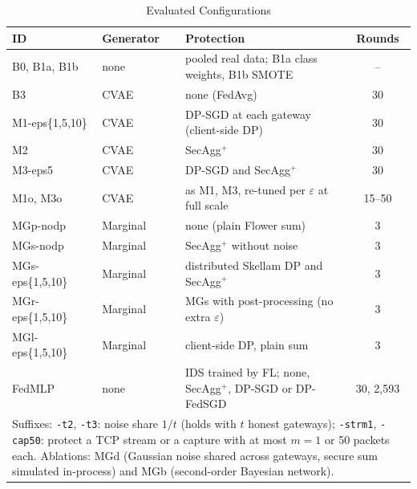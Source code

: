 \begin{table}[!t]
\centering
\caption{Evaluated Configurations}
\label{tab:configs}
\scriptsize
\setlength{\tabcolsep}{3pt}
\begin{tabularx}{\columnwidth}{l l >{\raggedright\arraybackslash}X c}
\toprule
\textbf{ID} & \textbf{Generator} & \textbf{Protection} & \textbf{Rounds} \\
\midrule
B0, B1a, B1b & none & pooled real data; B1a class weights, B1b SMOTE~\cite{chawla2002} & -- \\
B3           & CVAE & none (FedAvg) & 30 \\
M1-eps\{1,5,10\} & CVAE & DP-SGD at each gateway (client-side DP) & 30 \\
M2           & CVAE & SecAgg$^+$ & 30 \\
M3-eps5      & CVAE & DP-SGD and SecAgg$^+$ & 30 \\
M1o, M3o     & CVAE & as M1, M3, re-tuned per $\varepsilon$ at full scale & 15--50 \\
MGp-nodp     & Marginal & none (plain Flower sum) & 3 \\
MGs-nodp     & Marginal & SecAgg$^+$ without noise & 3 \\
MGs-eps\{1,5,10\} & Marginal & distributed Skellam DP and SecAgg$^+$ & 3 \\
MGr-eps\{1,5,10\} & Marginal & MGs with post-processing (no extra $\varepsilon$) & 3 \\
MGl-eps\{1,5,10\} & Marginal & client-side DP, plain sum & 3 \\
FedMLP       & none & IDS trained by FL; none, SecAgg$^+$, DP-SGD or DP-FedSGD & 30, 2,593 \\
\midrule
\multicolumn{4}{p{\dimexpr\columnwidth-2\tabcolsep\relax}}{Suffixes: \texttt{-t2}, \texttt{-t3}: noise share $1/t$ (holds with $t$ honest gateways); \texttt{-strm1}, \texttt{-cap50}: protect a TCP stream or a capture with at most $m = 1$ or 50 packets each. Ablations: MGd (Gaussian noise shared across gateways, secure sum simulated in-process) and MGb (second-order Bayesian network).} \\
\bottomrule
\end{tabularx}
\end{table}

